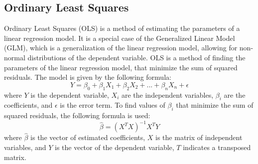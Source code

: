 \documentclass[12pt]{report}
\begin{document}
\subsection{Ordinary Least Squares}
Ordinary Least Squares (OLS) is a method of estimating the parameters of a linear regression model. It is a special case of the Generalized Linear Model (GLM), which is a generalization of the linear regression model, allowing for non-normal distributions of the dependent variable. OLS is a method of finding the parameters of the linear regression model, that minimize the sum of squared residuals. The model is given by the following formula:
\begin{equation}
	Y = \beta_0 + \beta_1 X_1 + \beta_2 X_2 + ... + \beta_n X_n + \epsilon
\end{equation}
where $Y$ is the dependent variable, $X_i$ are the independent variables, $\beta_i$ are the coefficients, and $\epsilon$ is the error term. To find values of \(\beta_i\) that minimize the sum of squared residuals, the following formula is used:
\begin{equation}
	\hat{\beta} = (X^T X)^{-1} X^T Y
\end{equation}
where $\hat{\beta}$ is the vector of estimated coefficients, $X$ is the matrix of independent variables, and $Y$ is the vector of the dependent variable, $T$ indicates a transposed matrix.
\end{document}
